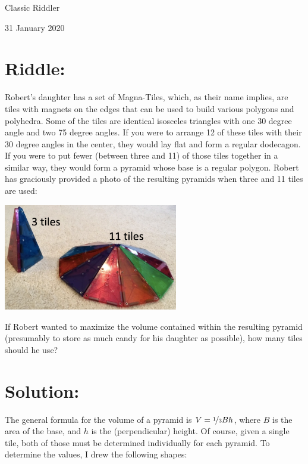 \documentclass{article}
\begin{document}
\pagestyle{empty} %

\begin{center}
{\LARGE Classic Riddler}

\vspace{0.15in}

{\Large 31 January 2020}
\end{center}


\section*{Riddle:}

Robert’s daughter has a set of Magna-Tiles, which, as their name implies, are tiles with magnets on the edges that can be used to build various polygons and polyhedra.
Some of the tiles are identical isosceles triangles with one 30 degree angle and two 75 degree angles.
If you were to arrange 12 of these tiles with their 30 degree angles in the center, they would lay flat and form a regular dodecagon.
If you were to put fewer (between three and 11) of those tiles together in a similar way, they would form a pyramid whose base is a regular polygon.
Robert has graciously provided a photo of the resulting pyramids when three and 11 tiles are used:

\vspace{0.15in}
\begin{center}
\includegraphics[width=3in]{pyramids.png}
\end{center}
\vspace{0.15in}

If Robert wanted to maximize the volume contained within the resulting pyramid (presumably to store as much candy for his daughter as possible), how many tiles should he use?

\section*{Solution:}

The general formula for the volume of a pyramid is $V=\nicefrac{1}{3}Bh$, where $B$ is the area of the base, and $h$ is the (perpendicular) height.
Of course, given a single tile, both of those must be determined individually for each pyramid.
To determine the values, I drew the following shapes:
\end{document}
